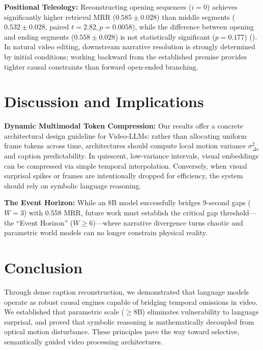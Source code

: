 \documentclass[10pt,twocolumn,letterpaper]{article}
\begin{document}
\noindent \textbf{Positional Teleology:} Reconstructing opening sequences (\(i=0\)) achieves significantly higher retrieval MRR (\(0.585 \pm 0.028\)) than middle segments (\(0.532 \pm 0.028\), paired \(t = 2.82, p = 0.0058\)), while the difference between opening and ending segments (\(0.558 \pm 0.028\)) is not statistically significant (\(p = 0.177\)) (). In natural video editing, downstream narrative resolution is strongly determined by initial conditions; working backward from the established premise provides tighter causal constraints than forward open-ended branching.

\section{Discussion and Implications}
\label{sec:discussion}

\noindent \textbf{Dynamic Multimodal Token Compression:}
Our results offer a concrete architectural design guideline for Video-LLMs: rather than allocating uniform frame tokens across time, architectures should compute local motion variance \(\sigma^2_{\Delta v}\) and caption predictability. In quiescent, low-variance intervals, visual embeddings can be compressed via simple temporal interpolation. Conversely, when visual surprisal spikes or frames are intentionally dropped for efficiency, the system should rely on symbolic language reasoning.

\noindent \textbf{The Event Horizon:}
While an 8B model successfully bridges 9-second gaps (\(W=3\)) with 0.558 MRR, future work must establish the critical gap threshold—the ``Event Horizon'' (\(W \ge 6\))—where narrative divergence turns chaotic and parametric world models can no longer constrain physical reality.

\section{Conclusion}
\label{sec:conclusion}
Through dense caption reconstruction, we demonstrated that language models operate as robust causal engines capable of bridging temporal omissions in video. We established that parametric scale (\(\ge 8\text{B}\)) eliminates vulnerability to language surprisal, and proved that symbolic reasoning is mathematically decoupled from optical motion disturbance. These principles pave the way toward selective, semantically guided video processing architectures.

{\footnotesize
\setlength{\bibsep}{0pt plus 0.3pt}


}
\end{document}

